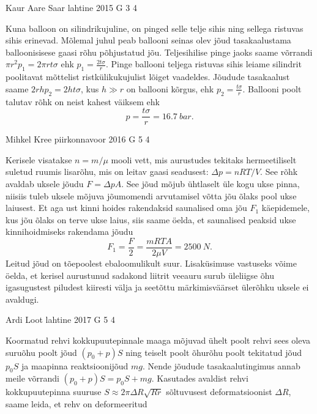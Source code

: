 \documentclass[11pt]{article}
\begin{document}
{%
{Kaur Aare Saar} %
{lahtine} %
{2015} %
{G 3} %
{4} %
{

\ifSolution
Kuna balloon on silindrikujuline, on pinged selle telje sihis ning sellega ristuvas sihis erinevad. Mõlemal juhul peab ballooni seinas olev jõud tasakaalustama balloonisisese gaasi rõhu põhjustatud jõu. Teljesihilise pinge jaoks saame võrrandi $\pi r^2 p_1=2\pi rt\sigma$ ehk $p_1=\frac{2t\sigma}{r}$. Pinge ballooni teljega ristuvas sihis leiame silindrit poolitavat mõttelist ristkülikukujulist lõiget vaadeldes. Jõudude tasakaalust saame $2rhp_2=2ht\sigma$, kus $h\gg r$ on ballooni kõrgus, ehk $p_2=\frac{t\sigma}{r}$. Ballooni poolt talutav rõhk on neist kahest väiksem ehk
\[
p=\frac{t\sigma}{r}=\SI{16,7}{bar}.
\]
\fi
}

{Mihkel Kree} %
{piirkonnavoor} %
{2016} %
{G 5} %
{4} %
{

\ifSolution
Kerisele visatakse $n=m/\mu$ mooli vett, mis aurustudes tekitaks hermeetiliselt suletud ruumis lisarõhu, mis on leitav gaasi seadusest: $\Delta p = nRT/V$. See rõhk avaldab uksele jõudu $F=\Delta p A$. See jõud mõjub ühtlaselt üle kogu ukse pinna, niisiis tuleb uksele mõjuva jõumomendi arvutamisel võtta jõu õlaks pool ukse laiusest. Et aga ust kinni hoides rakendaksid saunalised oma jõu $F_1$ käepidemele, kus jõu õlaks on terve ukse laius, siis saame öelda, et saunalised peaksid ukse kinnihoidmiseks rakendama jõudu
\[F_1 = \frac{F}{2} = \frac{mRTA}{2 \mu V} = \SI{2500}{N}.\]
Leitud jõud on tõepoolest ebaloomulikult suur. Lisaküsimuse vastuseks võime öelda, et kerisel aurustunud sadakond liitrit veeauru surub üleliigse õhu igasugustest piludest kiiresti välja ja seetõttu märkimisväärset ülerõhku uksele ei avaldugi.
\fi
}

{Ardi Loot} %
{lahtine} %
{2017} %
{G 5} %
{4} %
{

\ifSolution
Koormatud rehvi kokkupuutepinnale maaga mõjuvad ühelt poolt rehvi sees oleva suruõhu poolt jõud $\left(p_{0}+p\right)S$ ning teiselt
poolt õhurõhu poolt tekitatud jõud $p_{0}S$ ja maapinna reaktsioonijõud $mg$. Nende jõudude tasakaalutingimus annab meile võrrandi $\left(p_{0}+p\right)S=p_{0}S+mg.$ Kasutades avaldist rehvi kokkupuutepinna suuruse $S\approx2\pi\Delta R\sqrt{Rr}$ sõltuvusest deformatsioonist $\Delta R$, saame leida, et rehv on deformeeritud

}}
\end{document}
